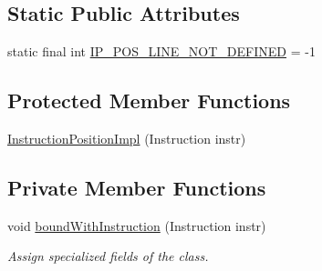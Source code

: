 \subsection*{Static Public Attributes}
\begin{DoxyCompactItemize}
\item 
static final int \hyperlink{interfacegov_1_1nasa_1_1jpf_1_1inspector_1_1interfaces_1_1_instruction_position_af542a3a926e7a0ef8ad18bde5ee98634}{I\+P\+\_\+\+P\+O\+S\+\_\+\+L\+I\+N\+E\+\_\+\+N\+O\+T\+\_\+\+D\+E\+F\+I\+N\+ED} = -\/1
\end{DoxyCompactItemize}
\subsection*{Protected Member Functions}
\begin{DoxyCompactItemize}
\item 
\hyperlink{classgov_1_1nasa_1_1jpf_1_1inspector_1_1server_1_1breakpoints_1_1_instruction_position_impl_a2e9d1e9ea04169808de4819d0f55ef8a}{Instruction\+Position\+Impl} (Instruction instr)
\end{DoxyCompactItemize}
\subsection*{Private Member Functions}
\begin{DoxyCompactItemize}
\item 
void \hyperlink{classgov_1_1nasa_1_1jpf_1_1inspector_1_1server_1_1breakpoints_1_1_instruction_position_impl_a2110f52fbee64b0fadb4aed30ee8c870}{bound\+With\+Instruction} (Instruction instr)
\begin{DoxyCompactList}\small\item\em Assign specialized fields of the class. \end{DoxyCompactList}\end{DoxyCompactItemize}
